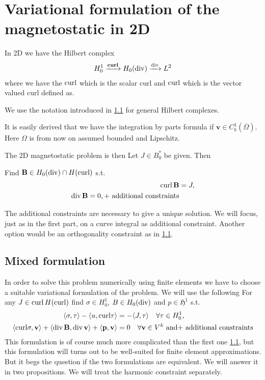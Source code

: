 \documentclass[../master_thesis.tex]{subfiles}
\begin{document}
\section{Variational formulation of the magnetostatic in 2D}

In 2D we have the Hilbert complex 
\begin{align*}
    H^1_0 \xrightarrow{\veccurl} H_0(\diver) \xrightarrow{\diver} L^2
\end{align*}
where we have the $\operatorname{curl}$ which is the scalar curl and 
$\mathbf{\operatorname{curl}}$ which is the vector valued curl defined as.

We use the notation introduced in \ref{} for general Hilbert complexes.

It is easily derived that we have the integration by parts formula if $\mathbf{v} \in C_b^1(\overline{\Omega})$.
Here $\Omega$ is from now on assumed bounded and Lipschitz.

The 2D magnetostatic problem is then
Let $J \in B^*_0$ be given. Then
\begin{problem}
    Find $\mathbf{B} \in H_0(\operatorname{div}) \cap H(\operatorname{curl})$ s.t.
    \begin{align*}
        \operatorname{curl} \mathbf{B} &= J,
        \\ \operatorname{div} \mathbf{B} = 0,
        \text{+ additional constraints}
    \end{align*}
\end{problem}
The additional constraints are necessary to give a unique solution. 
We will focus, just as in the first part, on 
a curve integral as additional constraint. 
Another option would be an orthogonality constraint as in \ref{}.

\subsection{Mixed formulation}
In order to solve this problem numerically using finite elements we have to 
choose a suitable variational formulation of the problem. We will use the following
For any $J \in \operatorname{curl} H(\operatorname{curl})$ find $\sigma \in H^1_0$, 
$B \in H_0(\operatorname{div})$ and $p \in \mathfrak{H}^1$ s.t.
\begin{align}
    \langle \sigma, \tau \rangle - \langle u, \mathbf{\operatorname{curl}}\tau \rangle 
        &=  -\langle J, \tau \rangle \quad \forall \tau \in H^1_0, \label{eq:first_eq_mixed_formulation}
    \\ \langle \mathbf{\operatorname{curl}}\sigma, \mathbf{v} \rangle + \langle \operatorname{div} \mathbf{B}, \operatorname{div} \mathbf{v} \rangle 
        + \langle \mathbf{p}, \mathbf{v} \rangle 
        &= 0 \quad \forall \mathbf{v} \in V^k \text{ and} \label{eq:second_eq_mixed_formulation}
        \text{+ additional constraints}
\end{align} 
This formulation is of course much more complicated than the first one \ref{}, 
but this formulation will turns out to be well-suited for finite element approximations.
But it begs the question if the two formulations are equivalent. We will answer it 
in two propositions. We will treat the harmonic constraint separately.
\end{document}
